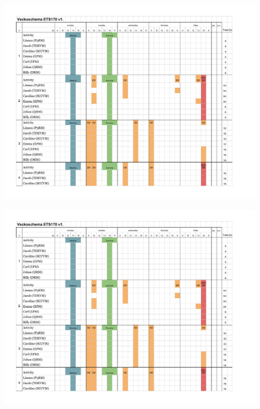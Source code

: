 \documentclass[10pt,a4paper]{article}
\begin{document}
\begin{appendices}
\begin{figure}[h!]
\centering
\includegraphics[page=2, width=1.1\textwidth, trim=0mm 0mm 0mm 0mm, clip]{Veckoschema.pdf}
\end{figure}

\begin{figure}[h!]
\centering
\includegraphics[page=3, width=1.1\textwidth, trim=0mm 140mm 0mm 0mm, clip]{Veckoschema.pdf}
\end{figure}


\end{appendices}
\end{document}
